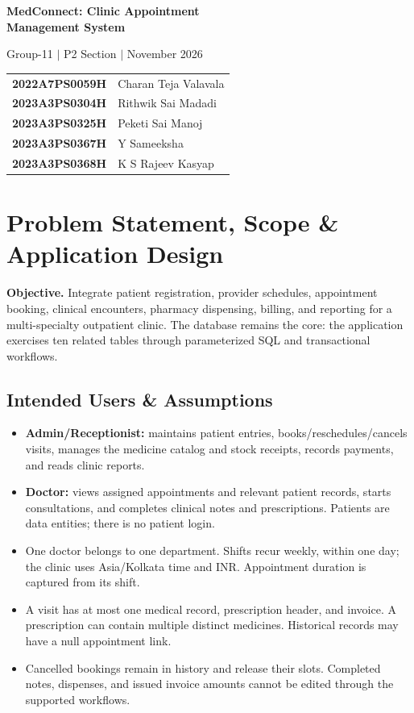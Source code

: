\documentclass[10pt,a4paper]{article}
\begin{document}
\begin{center}
{\LARGE\bfseries\color{primaryblue}MedConnect: Clinic Appointment\\Management System}\par
{}\par
{\small Group-11 $|$ P2 Section $|$ November 2026}\par\vspace{4pt}
\begin{tabular}{ll}
\textbf{2022A7PS0059H} & Charan Teja Valavala\\
\textbf{2023A3PS0304H} & Rithwik Sai Madadi\\
\textbf{2023A3PS0325H} & Peketi Sai Manoj\\
\textbf{2023A3PS0367H} & Y Sameeksha\\
\textbf{2023A3PS0368H} & K S Rajeev Kasyap
\end{tabular}
\end{center}
\vspace{5pt}
\section{Problem Statement, Scope \& Application Design}
\textbf{Objective.} Integrate patient registration, provider schedules, appointment booking, clinical encounters, pharmacy dispensing, billing, and reporting for a multi-specialty outpatient clinic. The database remains the core: the application exercises ten related tables through parameterized SQL and transactional workflows.

\subsection{Intended Users \& Assumptions}
\begin{itemize}
\item \textbf{Admin/Receptionist:} maintains patient entries, books/reschedules/cancels visits, manages the medicine catalog and stock receipts, records payments, and reads clinic reports.
\item \textbf{Doctor:} views assigned appointments and relevant patient records, starts consultations, and completes clinical notes and prescriptions. Patients are data entities; there is no patient login.
\item One doctor belongs to one department. Shifts recur weekly, within one day; the clinic uses Asia/Kolkata time and INR. Appointment duration is captured from its shift.
\item A visit has at most one medical record, prescription header, and invoice. A prescription can contain multiple distinct medicines. Historical records may have a null appointment link.
\item Cancelled bookings remain in history and release their slots. Completed notes, dispenses, and issued invoice amounts cannot be edited through the supported workflows.
\end{itemize}
\end{document}
